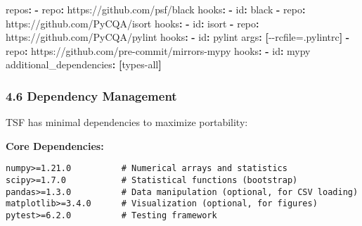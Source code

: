 \documentclass[
]{article}
\newenvironment{Shaded}{}{}
\newcommand{\AttributeTok}[1]{\textcolor[rgb]{0.49,0.56,0.16}{#1}}
\newcommand{\FunctionTok}[1]{\textcolor[rgb]{0.02,0.16,0.49}{#1}}
\newcommand{\KeywordTok}[1]{\textcolor[rgb]{0.00,0.44,0.13}{\textbf{#1}}}
\begin{document}
\begin{Shaded}
\begin{Highlighting}[]
\FunctionTok{repos}\KeywordTok{:}
\AttributeTok{  }\KeywordTok{{-}}\AttributeTok{ }\FunctionTok{repo}\KeywordTok{:}\AttributeTok{ https://github.com/psf/black}
\AttributeTok{    }\FunctionTok{hooks}\KeywordTok{:}
\AttributeTok{      }\KeywordTok{{-}}\AttributeTok{ }\FunctionTok{id}\KeywordTok{:}\AttributeTok{ black}
\AttributeTok{  }\KeywordTok{{-}}\AttributeTok{ }\FunctionTok{repo}\KeywordTok{:}\AttributeTok{ https://github.com/PyCQA/isort}
\AttributeTok{    }\FunctionTok{hooks}\KeywordTok{:}
\AttributeTok{      }\KeywordTok{{-}}\AttributeTok{ }\FunctionTok{id}\KeywordTok{:}\AttributeTok{ isort}
\AttributeTok{  }\KeywordTok{{-}}\AttributeTok{ }\FunctionTok{repo}\KeywordTok{:}\AttributeTok{ https://github.com/PyCQA/pylint}
\AttributeTok{    }\FunctionTok{hooks}\KeywordTok{:}
\AttributeTok{      }\KeywordTok{{-}}\AttributeTok{ }\FunctionTok{id}\KeywordTok{:}\AttributeTok{ pylint}
\AttributeTok{        }\FunctionTok{args}\KeywordTok{:}\AttributeTok{ }\KeywordTok{[}\AttributeTok{{-}{-}rcfile=.pylintrc}\KeywordTok{]}
\AttributeTok{  }\KeywordTok{{-}}\AttributeTok{ }\FunctionTok{repo}\KeywordTok{:}\AttributeTok{ https://github.com/pre{-}commit/mirrors{-}mypy}
\AttributeTok{    }\FunctionTok{hooks}\KeywordTok{:}
\AttributeTok{      }\KeywordTok{{-}}\AttributeTok{ }\FunctionTok{id}\KeywordTok{:}\AttributeTok{ mypy}
\AttributeTok{        }\FunctionTok{additional\_dependencies}\KeywordTok{:}\AttributeTok{ }\KeywordTok{[}\AttributeTok{types{-}all}\KeywordTok{]}
\end{Highlighting}
\end{Shaded}

\subsubsection{4.6 Dependency Management}\label{dependency-management}

TSF has minimal dependencies to maximize portability:

\textbf{Core Dependencies:}

\begin{verbatim}
numpy>=1.21.0          # Numerical arrays and statistics
scipy>=1.7.0           # Statistical functions (bootstrap)
pandas>=1.3.0          # Data manipulation (optional, for CSV loading)
matplotlib>=3.4.0      # Visualization (optional, for figures)
pytest>=6.2.0          # Testing framework
\end{verbatim}
\end{document}
